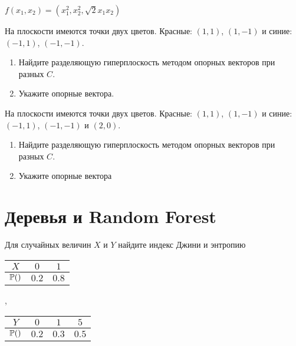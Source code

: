 \documentclass[pdftex,11pt,openany]{book}\usepackage[]{graphicx}\usepackage[]{color}
\begin{document}
\begin{solution}
$f(x_1,x_2)=(x_1^2,x_2^2,\sqrt{2}x_1x_2)$
\end{solution}


\begin{problem}
На плоскости имеются точки двух цветов. Красные: $(1,1)$, $(1,-1)$ и синие: $(-1,1)$, $(-1,-1)$. 
\begin{enumerate}
\item Найдите разделяющую гиперплоскость методом опорных векторов при разных $C$. 
\item Укажите опорные вектора.
\end{enumerate}
 
\end{problem}

\begin{solution}
\end{solution}

\begin{problem}
На плоскости имеются точки двух цветов. Красные: $(1,1)$, $(1,-1)$ и синие: $(-1,1)$, $(-1,-1)$ и $(2,0)$. 
\begin{enumerate}
\item Найдите разделяющую гиперплоскость методом опорных векторов при разных $C$.
\item Укажите опорные вектора
\end{enumerate}
 
\end{problem}

\begin{solution}
\end{solution}


\chapter{Деревья и Random Forest}


\begin{problem}
Для случайных величин  $X$ и $Y$ найдите индекс Джини и энтропию


\begin{tabular}{ccc}
$X$ & $0$ & $1$ \\ 
\hline 
$\P()$ & $0.2$ & $0.8$ \\ 
\end{tabular},
\begin{tabular}{cccc}
$Y$ & $0$ & $1$ & $5$ \\ 
\hline 
$\P()$ & $0.2$ & $0.3$ & $0.5$ \\ 
\end{tabular} 
\end{problem}
\end{document}
